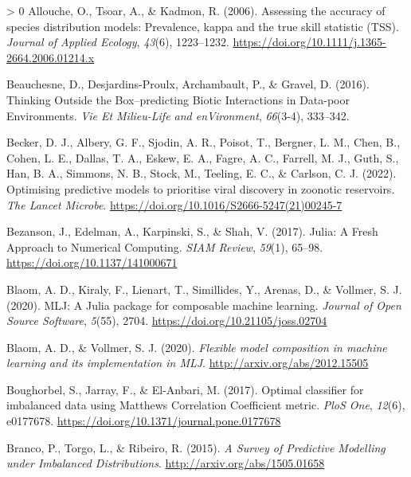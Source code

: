 \documentclass[11pt]{article}
\newlength{\cslhangindent}
\newenvironment{CSLReferences}[3] %
 {%
  \setlength{\parindent}{0pt}
  \ifodd #1 \everypar{\setlength{\hangindent}{\cslhangindent}}\ignorespaces\fi
  \ifnum #2 > 0
  \setlength{\parskip}{#2\baselineskip}
  \fi
 }%
 {}
\begin{document}
\hypertarget{refs}{}
\begin{CSLReferences}{1}{0}
\leavevmode\hypertarget{ref-Allouche2006AssAcc}{}%
Allouche, O., Tsoar, A., \& Kadmon, R. (2006). Assessing the accuracy of
species distribution models: Prevalence, kappa and the true skill
statistic (TSS). \emph{Journal of Applied Ecology}, \emph{43}(6),
1223--1232. \url{https://doi.org/10.1111/j.1365-2664.2006.01214.x}

\leavevmode\hypertarget{ref-Beauchesne2016ThiOut}{}%
Beauchesne, D., Desjardins-Proulx, Archambault, P., \& Gravel, D.
(2016). Thinking Outside the Box--predicting Biotic Interactions in
Data-poor Environments. \emph{Vie Et Milieu-Life and enVironment},
\emph{66}(3-4), 333--342.

\leavevmode\hypertarget{ref-Becker2022OptPre}{}%
Becker, D. J., Albery, G. F., Sjodin, A. R., Poisot, T., Bergner, L. M.,
Chen, B., Cohen, L. E., Dallas, T. A., Eskew, E. A., Fagre, A. C.,
Farrell, M. J., Guth, S., Han, B. A., Simmons, N. B., Stock, M.,
Teeling, E. C., \& Carlson, C. J. (2022). Optimising predictive models
to prioritise viral discovery in zoonotic reservoirs. \emph{The Lancet
Microbe}. \url{https://doi.org/10.1016/S2666-5247(21)00245-7}

\leavevmode\hypertarget{ref-Bezanson2017JulFre}{}%
Bezanson, J., Edelman, A., Karpinski, S., \& Shah, V. (2017). Julia: A
Fresh Approach to Numerical Computing. \emph{SIAM Review}, \emph{59}(1),
65--98. \url{https://doi.org/10.1137/141000671}

\leavevmode\hypertarget{ref-Blaom2020MljJul}{}%
Blaom, A. D., Kiraly, F., Lienart, T., Simillides, Y., Arenas, D., \&
Vollmer, S. J. (2020). MLJ: A Julia package for composable machine
learning. \emph{Journal of Open Source Software}, \emph{5}(55), 2704.
\url{https://doi.org/10.21105/joss.02704}

\leavevmode\hypertarget{ref-Blaom2020FleMod}{}%
Blaom, A. D., \& Vollmer, S. J. (2020). \emph{Flexible model composition
in machine learning and its implementation in MLJ}.
\url{http://arxiv.org/abs/2012.15505}

\leavevmode\hypertarget{ref-Boughorbel2017OptCla}{}%
Boughorbel, S., Jarray, F., \& El-Anbari, M. (2017). Optimal classifier
for imbalanced data using Matthews Correlation Coefficient metric.
\emph{PloS One}, \emph{12}(6), e0177678.
\url{https://doi.org/10.1371/journal.pone.0177678}

\leavevmode\hypertarget{ref-Branco2015SurPre}{}%
Branco, P., Torgo, L., \& Ribeiro, R. (2015). \emph{A Survey of
Predictive Modelling under Imbalanced Distributions}.
\url{http://arxiv.org/abs/1505.01658}


\end{CSLReferences}
\end{document}
